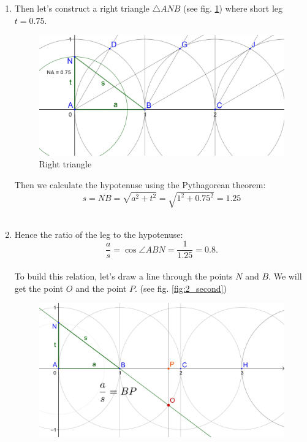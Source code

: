 \documentclass[12pt, letterpaper, oneside]{report}
\begin{document}
\begin{enumerate}
	\item Then let's construct a right triangle $\triangle ANB$ (see fig. \ref{fig:1_anb}) where short leg $t=0.75$. \\
\begin{figure}[H]
	\centerline{\includegraphics[scale=0.18]{img/1_anb.jpg}}
	\caption{Right triangle}
	\label{fig:1_anb}
\end{figure}	
	Then we calculate the hypotenuse using the Pythagorean theorem:
\begin{equation}
s=\overline{NB}=\sqrt{a^{2}+t^{2}}=\sqrt{1^{2}+0.75^{2}}=1.25
\end{equation}
\\
	\item Hence the ratio of the leg to the hypotenuse:
\begin{equation}
	\dfrac{a}{s}=\cos \angle ABN=\dfrac{1}{1.25}=0.8.
\end{equation}
\\
To build this relation, let's draw a line through the points $N$ and $B$. We will get the point $O$ and the point $P$. (see fig. \ref{fig:2_second})
\begin{figure}[h]
	\centerline{\includegraphics[scale=0.2]{img/anbo.jpg}}
	\caption{}

\end{figure}
\end{enumerate}
\end{document}
